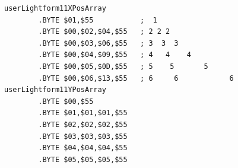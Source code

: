 \begin{minipage}[b]{0.48\linewidth}
\begin{lrbox}{\mybox}%
\hspace{1cm}
\begin{lstlisting}[basicstyle=\ttfamily\tiny,escapechar=\%]
userLightform11XPosArray
        .BYTE $01,$55           ;  1                  
        .BYTE $00,$02,$04,$55   ; 2 2 2               
        .BYTE $00,$03,$06,$55   ; 3  3  3             
        .BYTE $00,$04,$09,$55   ; 4   4    4          
        .BYTE $00,$05,$0D,$55   ; 5    5       5      
        .BYTE $00,$06,$13,$55   ; 6     6            6
userLightform11YPosArray
        .BYTE $00,$55
        .BYTE $01,$01,$01,$55
        .BYTE $02,$02,$02,$55
        .BYTE $03,$03,$03,$55
        .BYTE $04,$04,$04,$55
        .BYTE $05,$05,$05,$55
\end{lstlisting}
\end{lrbox}%
\scalebox{0.8}{\usebox{\mybox}}

\end{minipage}
%
%

